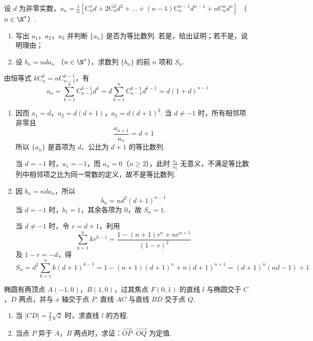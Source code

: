 \begin{problem}
设 \(d\) 为非零实数，\(a_{n} = \frac{1}{n}\left[\mathrm C_n^1d + 2\mathrm C_n^2d^{2} + \dots + (n - 1)\mathrm C_n^{n - 1}d^{n - 1} + n\mathrm C_n^nd^{n}\right]\) （\(n\in \N^{*}\)）.
\begin{enumerate}
\item 写出 \(a_1\)，\(a_2\)，\(a_3\) 并判断 \(\{a_n\}\) 是否为等比数列. 若是，给出证明；若不是，说明理由；
\item 设 \( b_n = nda_n \) （\( n \in \N^{*} \)），求数列 \( \{b_n\} \) 的前 \( n \) 项和 \( S_n \).
\end{enumerate}
\end{problem}

\begin{solution}
由恒等式 \(k\mathrm C_n^k=n\mathrm C_{n-1}^{k-1}\)，有
\[
a_n=\sum_{k=1}^{n}\mathrm C_{n-1}^{k-1}d^k
 =d\sum_{k=1}^{n}\mathrm C_{n-1}^{k-1}d^{k-1}
 =d(1+d)^{n-1}
\]
\begin{enumerate}
\item 因而
\(a_1=d\)，\(a_2=d(d+1)\)，\(a_3=d(d+1)^2\).
当 \(d\neq-1\) 时，所有相邻项非零且
\[
\frac{a_{n+1}}{a_n}=d+1
\]
所以 \(\{a_n\}\) 是首项为 \(d\)、公比为 \(d+1\) 的等比数列.

当 \(d=-1\) 时，\(a_1=-1\)，而 \(a_n=0\)（\(n\geqslant2\)），此时 \(\frac{a_3}{a_2}\) 无意义，不满足等比数列中相邻项之比为同一常数的定义，故不是等比数列.

\item 因 \(b_n=nd a_n\)，所以
\[
b_n=nd^2(d+1)^{n-1}
\]
当 \(d=-1\) 时，\(b_1=1\)，其余各项为 0，故 \(S_n=1\).

当 \(d\neq-1\) 时，令 \(r=d+1\)，利用
\[
\sum_{k=1}^{n}kr^{k-1}=\frac{1-(n+1)r^n+nr^{n+1}}{(1-r)^2}
\]
及 \(1-r=-d\)，得
\[
S_n=d^2\sum_{k=1}^{n}k(d+1)^{k-1}
 =1-(n+1)(d+1)^n+n(d+1)^{n+1}
 =(d+1)^n(nd-1)+1
\]
\end{enumerate}
\end{solution}

\begin{problem}
椭圆有两顶点 \(A(-1,0)\)，\(B(1,0)\)，过其焦点 \(F(0,1)\) 的直线 \(l\) 与椭圆交于 \(C\)，\(D\) 两点，并与 \(x\) 轴交于点 \(P\). 直线 \(AC\) 与直线 \(BD\) 交于点 \(Q\).
\begin{enumerate}
\item 当 \(|CD| = \frac{3}{2}\sqrt{2}\) 时，求直线 \(l\) 的方程.
\item 当点 \(P\) 异于 \(A\)，\(B\) 两点时，求证：\(\overrightarrow{OP} \cdot \overrightarrow{OQ}\) 为定值.
\end{enumerate}

\end{problem}

